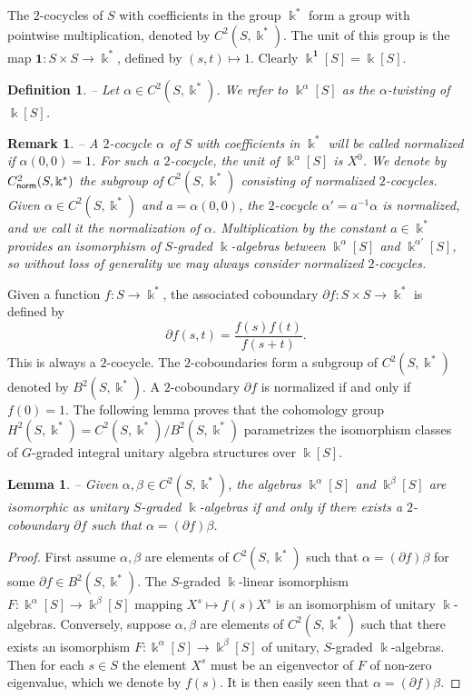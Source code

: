 \documentclass[twoside,11pt]{article}
\newcommand{\norm}{{\sf norm}}
\renewcommand{\k}{\Bbbk}
\newtheorem{subdefinition}[subtheorem]{Definition}
\newtheorem{sublemma}[subtheorem]{Lemma}
\newtheorem{subremark}[subtheorem]{Remark}
\begin{document}
The $2$-cocycles of $S$ with coefficients in the group $\k^*$ form a group with pointwise
multiplication, denoted by $C^2(S,\k^*)$. The unit of this group is the map $\textbf{1} :
S \times S \longrightarrow \k^*$, defined by $(s,t) \mapsto 1$. Clearly
$\k^{\textbf{1}}[S] = \k[S]$.

\begin{subdefinition} -- 
Let $\alpha \in C^2(S,\k^*)$. We refer to $\k^{\alpha}[S]$ as the \emph{$\alpha$-twisting}
of $\k[S]$.
\end{subdefinition}


\begin{subremark} -- \rm  
A $2$-cocycle $\alpha$ of $S$ with coefficients in $\k^*$ will be called
\emph{normalized} if $\alpha(0,0) = 1$. For such a $2$-cocycle, the unit of $\k^\alpha[S]$
is $X^0$. We denote by $C^2_{\norm}(S,\k^*)$ the subgroup of $C^2(S, \k^*)$ consisting of
normalized $2$-cocycles.
Given $\alpha \in C^2(S, \k^*)$ and $a = \alpha(0,0)$, the $2$-cocycle $\alpha' =
a^{-1}\alpha$ is normalized, and we call it the \emph{normalization} of $\alpha$.
Multiplication by the constant $a \in \k^*$ provides an isomorphism of $S$-graded
$\k$-algebras between $\k^\alpha[S]$ and $\k^{\alpha'}[S]$, so without loss of generality
we may always consider normalized $2$-cocycles.
\end{subremark}

Given a function $f: S \to \k^*$, the associated coboundary $\partial f : S \times S \to
\k^*$ is defined by 
\[
\partial f(s,t) = \frac{f(s)f(t)}{f(s+t)}.
\]
This is always a $2$-cocycle. The $2$-coboundaries form a subgroup of $C^2(S,\k^*)$
denoted by $B^2(S,\k^*)$. A $2$-coboundary $\partial f$ is normalized if and only if
$f(0)=1$. The following lemma proves that the cohomology group $H^2(S, \k^*) = C^2(S,
\k^*) / B^2(S, \k^*)$ parametrizes the isomorphism classes of $G$-graded integral unitary
algebra structures over $\k[S]$.

\begin{sublemma} -- 
Given $\alpha, \beta \in C^2(S,\k^*)$, the algebras $\k^\alpha[S]$ and $\k^\beta[S]$ are
isomorphic as unitary $S$-graded $\k$-algebras if and only if there exists a
$2$-coboundary $\partial f$ such that $\alpha = (\partial f)\beta$.
\end{sublemma}

\begin{proof} First assume $\alpha,\beta$ are elements of $C^2(S,\k^*)$ such that $\alpha =
(\partial f) \beta$ for some $\partial f \in B^2(S,\k^*)$. The $S$-graded $\k$-linear
isomorphism $F : \k^\alpha[S] \longrightarrow \k^\beta[S]$ mapping $X^s \mapsto f(s)
X^s$ is an isomorphism of unitary $\k$-algebras.
Conversely, suppose $\alpha,\beta$ are elements of $C^2(S,\k^*)$ such that there exists an
isomorphism $F : \k^\alpha[S] \longrightarrow \k^\beta[S]$ of unitary, $S$-graded
$\k$-algebras. Then for each $s\in S$ the element $X^s$ must be an eigenvector of $F$
of non-zero eigenvalue, which we denote by $f(s)$. It is then easily seen that $\alpha =
(\partial f) \beta$. \end{proof}
 
\end{document}
